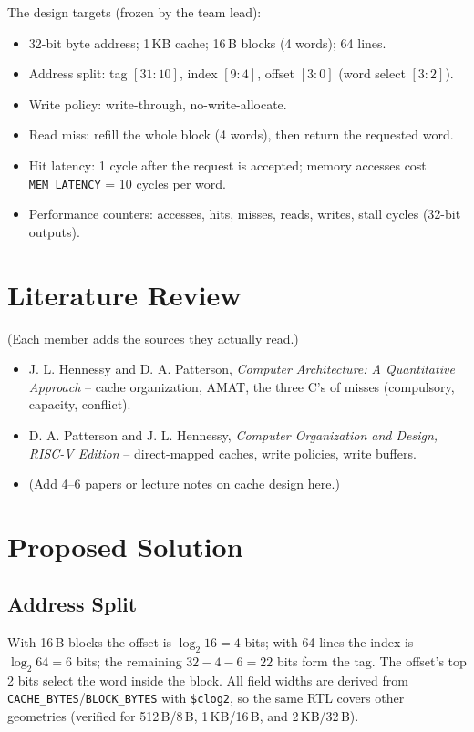 \documentclass[conference]{IEEEtran}
\begin{document}
The design targets (frozen by the team lead):
\begin{itemize}
  \item 32-bit byte address; 1\,KB cache; 16\,B blocks (4 words); 64 lines.
  \item Address split: tag $[31:10]$, index $[9:4]$, offset $[3:0]$
        (word select $[3:2]$).
  \item Write policy: write-through, no-write-allocate.
  \item Read miss: refill the whole block (4 words), then return the
        requested word.
  \item Hit latency: 1 cycle after the request is accepted; memory accesses
        cost \texttt{MEM\_LATENCY} = 10 cycles per word.
  \item Performance counters: accesses, hits, misses, reads, writes, stall
        cycles (32-bit outputs).
\end{itemize}

\section{Literature Review}
(Each member adds the sources they actually read.)
\begin{itemize}
  \item J. L. Hennessy and D. A. Patterson, \emph{Computer Architecture:
        A Quantitative Approach} -- cache organization, AMAT, the three C's
        of misses (compulsory, capacity, conflict).
  \item D. A. Patterson and J. L. Hennessy, \emph{Computer Organization and
        Design, RISC-V Edition} -- direct-mapped caches, write policies,
        write buffers.
  \item (Add 4--6 papers or lecture notes on cache design here.)
\end{itemize}

\section{Proposed Solution}
\subsection{Address Split}
With 16\,B blocks the offset is $\log_2 16 = 4$ bits; with 64 lines the index
is $\log_2 64 = 6$ bits; the remaining $32-4-6 = 22$ bits form the tag.
The offset's top 2 bits select the word inside the block. All field widths
are derived from \texttt{CACHE\_BYTES}/\texttt{BLOCK\_BYTES} with
\texttt{\$clog2}, so the same RTL covers other geometries (verified for
512\,B/8\,B, 1\,KB/16\,B, and 2\,KB/32\,B).
\end{document}
